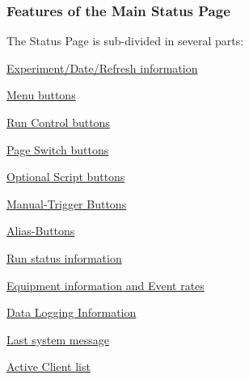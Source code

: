 \subsubsection{Features of the Main Status Page}\label{RC_mhttpd_status_page_features}
 The Status Page is sub-\/divided in several parts:
\begin{DoxyItemize}
\item \hyperlink{RC_mhttpd_status_page_features_RC_mhttpd_status_title}{Experiment/Date/Refresh information}
\item \hyperlink{RC_mhttpd_status_page_features_RC_mhttpd_status_menu_buttons}{Menu buttons}
\begin{DoxyItemize}
\item \hyperlink{RC_mhttpd_status_page_features_RC_mhttpd_status_RC_buttons}{Run Control buttons}
\item \hyperlink{RC_mhttpd_status_page_features_RC_mhttpd_status_Page_buttons}{Page Switch buttons}
\end{DoxyItemize}
\item \hyperlink{RC_mhttpd_status_page_features_RC_mhttpd_status_script_buttons}{Optional Script buttons}
\item \hyperlink{RC_mhttpd_status_page_features_RC_mhttpd_status_Manual_Trigger_buttons}{Manual-\/Trigger Buttons}
\item \hyperlink{RC_mhttpd_status_page_features_RC_mhttpd_status_Alias_buttons}{Alias-\/Buttons}
\item \hyperlink{RC_mhttpd_status_page_features_RC_mhttpd_status_Run_info}{Run status information}
\item \hyperlink{RC_mhttpd_status_page_features_RC_mhttpd_status_Equipment_info}{Equipment information and Event rates}
\item \hyperlink{RC_mhttpd_status_page_features_RC_mhttpd_status_Logger}{Data Logging Information}
\item \hyperlink{RC_mhttpd_status_page_features_RC_mhttpd_status_latest_msg}{Last system message}
\item \hyperlink{RC_mhttpd_status_page_features_RC_mhttpd_status_clients}{Active Client list}
\end{DoxyItemize}

